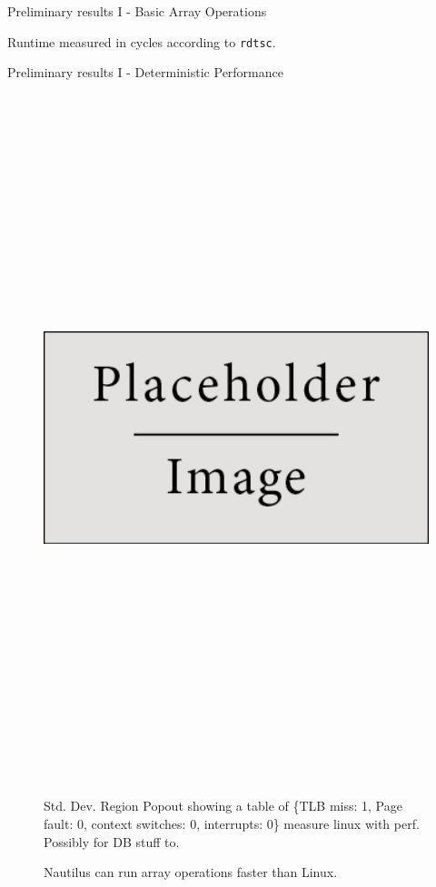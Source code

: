 \begin{block}{Preliminary results I - Basic Array Operations}
\begin{table}
    Runtime measured in cycles according to \texttt{rdtsc}.

    \caption{Performance of Linux vs Nautilus on basic array operations averaged over 10 runs.}
  \end{table}
  
\end{block}

\begin{block}{Preliminary results I - Deterministic Performance}

  \begin{figure}
    \includegraphics[height=20cm]{place_holder.png}

    Std. Dev. Region
    Popout showing a table of \{TLB miss: 1, Page fault: 0, context switches: 0, interrupts: 0\}
    measure linux with perf.
    Possibly for DB stuff to.
    \caption{Nautilus can run array operations faster than Linux.}
  \end{figure}
\end{block}
